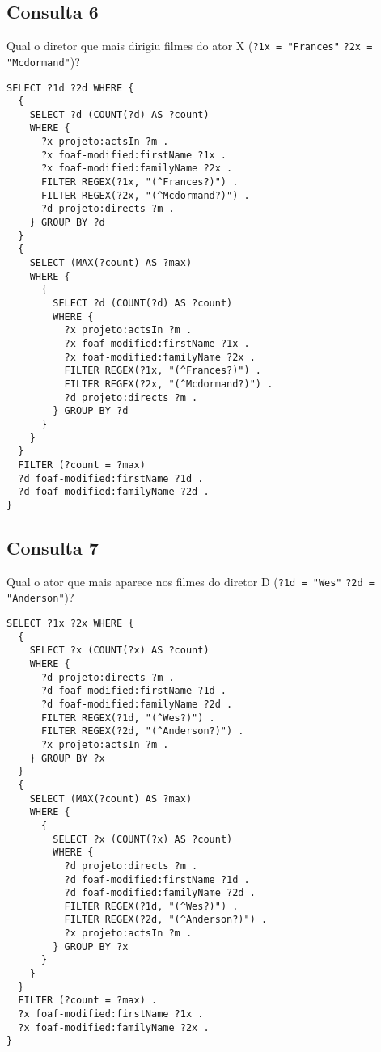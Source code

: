 \documentclass{article}
\newcommand{\code}[1]{\lstinline[mathescape=true]{#1}}
\begin{document}
\subsection{Consulta 6}
Qual o diretor que mais dirigiu filmes do ator X (\code{?1x = "Frances"} \code{?2x = "Mcdormand"})?
\begin{lstlisting}[basicstyle=\ttfamily,frame=single]
SELECT ?1d ?2d WHERE {
  {
    SELECT ?d (COUNT(?d) AS ?count)
    WHERE {
      ?x projeto:actsIn ?m .
      ?x foaf-modified:firstName ?1x .
      ?x foaf-modified:familyName ?2x .
      FILTER REGEX(?1x, "(^Frances?)") .
      FILTER REGEX(?2x, "(^Mcdormand?)") .
      ?d projeto:directs ?m .
    } GROUP BY ?d
  }
  {
    SELECT (MAX(?count) AS ?max)
    WHERE {
      {
        SELECT ?d (COUNT(?d) AS ?count)
        WHERE {
          ?x projeto:actsIn ?m .
          ?x foaf-modified:firstName ?1x .
          ?x foaf-modified:familyName ?2x .
          FILTER REGEX(?1x, "(^Frances?)") .
          FILTER REGEX(?2x, "(^Mcdormand?)") .
          ?d projeto:directs ?m .
        } GROUP BY ?d
      }
    }
  }
  FILTER (?count = ?max)
  ?d foaf-modified:firstName ?1d .
  ?d foaf-modified:familyName ?2d .
}
\end{lstlisting}
\subsection{Consulta 7}
Qual o ator que mais aparece nos filmes do diretor D (\code{?1d = "Wes"} \code{?2d = "Anderson"})?
\begin{lstlisting}[basicstyle=\ttfamily,frame=single]
SELECT ?1x ?2x WHERE {
  {
    SELECT ?x (COUNT(?x) AS ?count)
    WHERE {
      ?d projeto:directs ?m .
      ?d foaf-modified:firstName ?1d .
      ?d foaf-modified:familyName ?2d .
      FILTER REGEX(?1d, "(^Wes?)") .
      FILTER REGEX(?2d, "(^Anderson?)") .
      ?x projeto:actsIn ?m .
    } GROUP BY ?x
  }
  {
    SELECT (MAX(?count) AS ?max)
    WHERE {
      {
        SELECT ?x (COUNT(?x) AS ?count)
        WHERE {
          ?d projeto:directs ?m .
          ?d foaf-modified:firstName ?1d .
          ?d foaf-modified:familyName ?2d .
          FILTER REGEX(?1d, "(^Wes?)") .
          FILTER REGEX(?2d, "(^Anderson?)") .
          ?x projeto:actsIn ?m .
        } GROUP BY ?x
      }
    }
  }
  FILTER (?count = ?max) .
  ?x foaf-modified:firstName ?1x .
  ?x foaf-modified:familyName ?2x .
}
\end{lstlisting}
\end{document}
